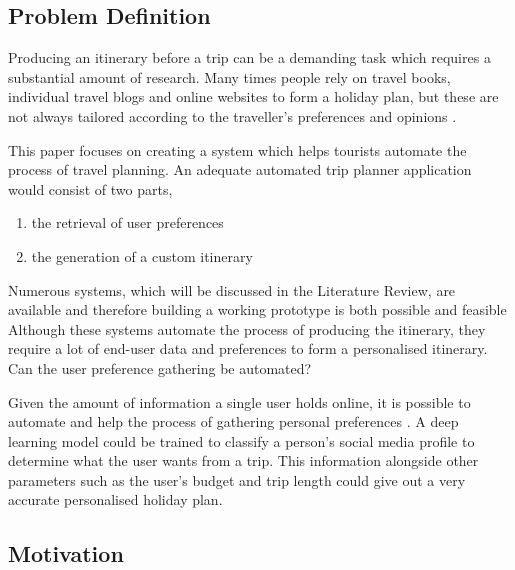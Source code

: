 \subsection{Problem Definition}

        Producing an itinerary before a trip can be a demanding task
        which requires  a substantial amount of  research. Many times
        people rely on travel books, individual travel blogs and
        online websites to form a holiday plan, but these are not
        always tailored according to the traveller’s preferences and
        opinions \cite{DeChoudhury2010}. 

        This paper focuses on creating a system which helps tourists
        automate the process of travel planning. An adequate automated
        trip planner application would consist of two parts, 
        
        \begin{enumerate}
                \item the retrieval of user preferences 
                \item the generation of a custom itinerary
        \end{enumerate}
        Numerous systems, which will be discussed in the Literature
        Review, are available and therefore building a working
        prototype is both possible and feasible
        Although these systems automate the process of producing the
        itinerary, they require a lot of end-user data and preferences
        to form a personalised itinerary. Can the user preference
        gathering be automated?

        Given the amount of information a single user holds online, it
        is possible to automate and help the process of gathering
        personal preferences \cite{Buraya2017}. A deep learning model
        could be trained to classify a person's social media profile
        to determine what the user wants from a trip. This information
        alongside other parameters such as the user's budget and trip
        length could give out a very accurate personalised holiday
        plan.

\subsection{Motivation}

